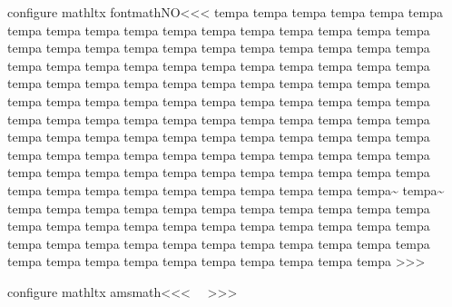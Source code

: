 {{\<configure mathltx fontmathNO\><<<
\def\:tempa#1{%
   \def\:temp{\HCode{\string#1\space}}%
   \HLet#1\:temp }
\:tempa\Delta
\:tempa\Gamma
\:tempa\Im
\:tempa\Lambda
\:tempa\Leftarrow
\:tempa\Leftrightarrow
\:tempa\Omega
\:tempa\Phi
\:tempa\Pi
\:tempa\Psi
\:tempa\Re
\:tempa\Rightarrow
\:tempa\Sigma
\:tempa\Theta
\:tempa\Upsilon
\:tempa\Xi
\:tempa\aleph
\:tempa\alpha
\:tempa\amalg
\:tempa\angle
\:tempa\approx
\:tempa\ast
\:tempa\asymp
\:tempa\beta
\:tempa\bot
\:tempa\bullet
\:tempa\cap
\:tempa\cdot
\:tempa\chi
\:tempa\circ
\:tempa\clubsuit
\:tempa\coprod
\:tempa\cup
\:tempa\dagger
\:tempa\dashv
\:tempa\ddagger
\:tempa\delta
\:tempa\diamond
\:tempa\diamondsuit
\:tempa\div
\:tempa\ell
\:tempa\emptyset
\:tempa\epsilon
\:tempa\equiv
\:tempa\eta
\:tempa\exists
\:tempa\flat
\:tempa\forall
\:tempa\frown
\:tempa\gamma
\:tempa\ge
\:tempa\geq
\:tempa\gg
\:tempa\hbar
\:tempa\heartsuit
\:tempa\imath
\:tempa\in
\:tempa\infty
\:tempa\intop
\:tempa\iota
\:tempa\jmath
\:tempa\kappa
\:tempa\lambda
\:tempa\land
\:tempa\le
\:tempa\leftarrow
\:tempa\leftharpoondown
\:tempa\leftharpoonup
\:tempa\leftrightarrow
\:tempa\leq
\:tempa\ll
\:tempa\lnot
\:tempa\lor
\:tempa\mapstochar
\:tempa\mid
\:tempa\mp
\:tempa\mu
\:tempa\nabla
\:tempa\natural
\:tempa\ne
\:tempa\nearrow
\:tempa\neg
\:tempa\neq
\:tempa\ni
\:tempa\not
\:tempa\nu
\:tempa\nwarrow
\:tempa\odot
\:tempa\oint
\:tempa\ointop
\:tempa\omega
\:tempa\ominus
\:tempa\oplus
\:tempa\oslash
\:tempa\otimes
\:tempa\parallel
\:tempa\partial
\:tempa\perp
\:tempa\phi
\:tempa\pi
\:tempa\pm
\:tempa\prec
\:tempa\preceq
\:tempa\prime
\:tempa\prod
\:tempa\propto
\:tempa\psi
\:tempa\rho
\:tempa\rightarrow
\:tempa\rightharpoondown
\:tempa\rightharpoonup
\:tempa\searrow
\:tempa\setminus
\:tempa\sharp
\:tempa\sigma
\:tempa\sim
\:tempa\sim
\:tempa\simeq
\:tempa\simeq
\:tempa\smallint
\:tempa\smile
\:tempa\spadesuit
\:tempa\sqcap
\:tempa\sqcup
\:tempa\sqsubseteq
\:tempa\sqsupseteq
\:tempa\star
\:tempa\subset
\:tempa\subseteq
\:tempa\succ
\:tempa\succeq
\:tempa\sum
\:tempa\supset
\:tempa\supseteq
\:tempa\surd
\:tempa\swarrow
\:tempa\tau
\:tempa\theta
\:tempa\times
\:tempa\top
\:tempa\triangle
\:tempa\triangleleft
\:tempa\triangleright
\:tempa\uplus
\:tempa\upsilon
\:tempa\varbigtriangledown
\:tempa\varbigtriangleup
\:tempa\varepsilon
\:tempa\varphi
\:tempa\varpi
\:tempa\varrho
\:tempa\varsigma
\:tempa\vartheta
\:tempa\vdash
\:tempa\vee
\:tempa\wedge
\:tempa\wp
\:tempa\wr
\:tempa\xi
\:tempa\zeta
>>>




\<configure mathltx amsmath\><<<
\def\:temp{\HCode{\string\firstOfOne}\,\HCode{\string\int
                                              \string\int\space}} 
\HLet\iint\:temp 
\def\:temp{\HCode{\string\firstOfOne}\,\HCode{\string\int
                                              \string\int\string\int\space}} 
\HLet\iiint\:temp 
\def\:temp{\HCode{\string\Rightarrow }}
\HLet\implies\:temp
\def\:temp{\HCode{\string\Leftarrow }}
\HLet\impliedby\:temp
>>>





}}
